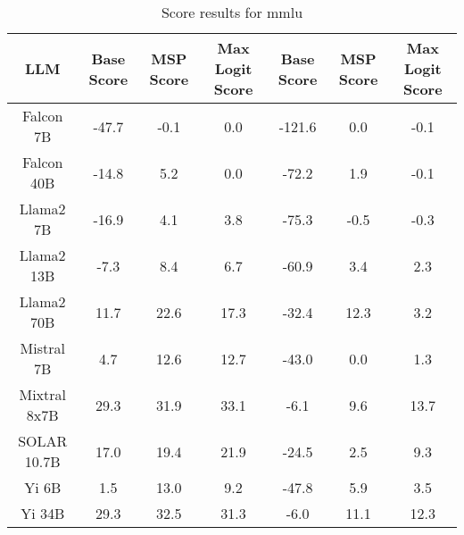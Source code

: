 \renewcommand\arraystretch{1.2}
\begin{table*}
\centering
\begin{tabular}{c|c|c|c|c|c|c}
LLM & Base Score & MSP Score & Max Logit Score & Base Score & MSP Score & Max Logit Score\\ \hline
Falcon 7B & -47.7 & -0.1 & 0.0 & -121.6 & 0.0 & -0.1\\
Falcon 40B & -14.8 & 5.2 & 0.0 & -72.2 & 1.9 & -0.1\\
Llama2 7B & -16.9 & 4.1 & 3.8 & -75.3 & -0.5 & -0.3\\
Llama2 13B & -7.3 & 8.4 & 6.7 & -60.9 & 3.4 & 2.3\\
Llama2 70B & 11.7 & 22.6 & 17.3 & -32.4 & 12.3 & 3.2\\
Mistral 7B & 4.7 & 12.6 & 12.7 & -43.0 & 0.0 & 1.3\\
Mixtral 8x7B & 29.3 & 31.9 & 33.1 & -6.1 & 9.6 & 13.7\\
SOLAR 10.7B & 17.0 & 19.4 & 21.9 & -24.5 & 2.5 & 9.3\\
Yi 6B & 1.5 & 13.0 & 9.2 & -47.8 & 5.9 & 3.5\\
Yi 34B & 29.3 & 32.5 & 31.3 & -6.0 & 11.1 & 12.3\\
\hline
\end{tabular}
\caption{Score results for mmlu}
\end{table*}
\label{tab:mmlu_score}
